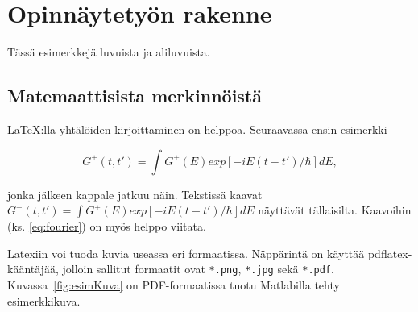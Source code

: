 \chapter{Opinnäytetyön rakenne}

Tässä esimerkkejä luvuista ja aliluvuista.

\section{Matemaattisista merkinnöistä}

\LaTeX:lla yhtälöiden kirjoittaminen on helppoa. Seuraavassa ensin esimerkki 

\begin{equation}
  \label{eq:fourier}
  G^+(t,t')= \int G^+(E) exp[-iE(t-t')/\hbar] dE,
\end{equation}

jonka jälkeen kappale jatkuu näin.
Tekstissä kaavat $G^+(t,t')= \int G^+(E) exp[-iE(t-t')/\hbar] dE$ näyttävät
tällaisilta. Kaavoihin (ks. \ref{eq:fourier}) on myös helppo viitata.

%


Latexiin voi tuoda kuvia useassa eri formaatissa.
Näppärintä on käyttää pdflatex-kääntäjää, jolloin
sallitut formaatit ovat \verb+*.png+, \verb+*.jpg+
sekä \verb+*.pdf+. Kuvassa~\ref{fig:esimKuva} on
PDF-formaatissa tuotu Matlabilla tehty
esimerkkikuva.
